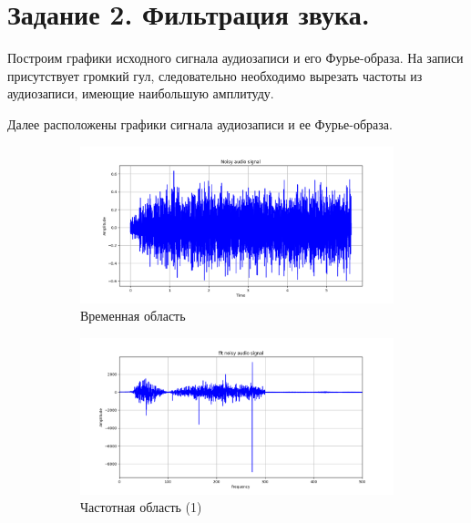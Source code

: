 \documentclass[a4paper, 12pt]{article}
\begin{document}
    \section{Задание 2. Фильтрация звука.}
    Построим графики исходного сигнала аудиозаписи и его Фурье-образа.
    На записи присутствует громкий гул, следовательно необходимо вырезать частоты из аудиозаписи, имеющие наибольшую амплитуду.

    Далее расположены графики сигнала аудиозаписи и ее Фурье-образа.
    \begin{figure}[H]
        \centering
        \begin{subfigure}{0.45\textwidth}
            \centering
            \includegraphics[width=\linewidth]{audio.png}
            \caption{Временная область}
            \label{fig:fig111}
        \end{subfigure}
        \hspace{5mm}
        \begin{subfigure}{0.45\textwidth}
            \centering
            \includegraphics[width=\linewidth]{U_audio.png}
            \caption{Частотная область (1)}
            \label{fig:fig112}
        \end{subfigure}
        \begin{subfigure}{0.45\textwidth}

\end{subfigure}
\end{figure}
\end{document}
